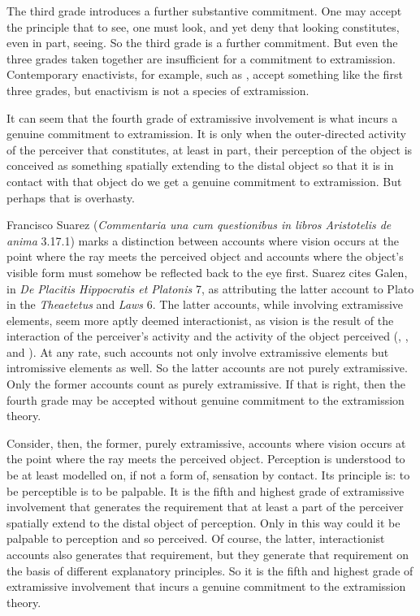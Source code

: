 \documentclass[12pt]{article}
\begin{document}
The third grade introduces a further substantive commitment. One may accept the principle that to see, one must look, and yet deny that looking constitutes, even in part, seeing. So the third grade is a further commitment. But even the three grades taken together are insufficient for a commitment to extramission. Contemporary enactivists, for example, such as \citet{Noe:2004fk}, accept something like the first three grades, but enactivism is not a species of extramission.

It can seem that the fourth grade of extramissive involvement is what incurs a genuine commitment to extramission. It is only when the outer-directed activity of the perceiver that constitutes, at least in part, their perception of the object is conceived as something spatially extending to the distal object so that it is in contact with that object do we get a genuine commitment to extramission. But perhaps that is overhasty. 

Francisco Suarez (\emph{Commentaria una cum questionibus in libros Aristotelis de anima} 3.17.1) marks a distinction between accounts where vision occurs at the point where the ray meets the perceived object and accounts where the object's visible form must somehow be reflected back to the eye first. Suarez cites Galen, in \emph{De Placitis Hippocratis et Platonis} 7, as attributing the latter account to Plato in the \emph{Theaetetus} and \emph{Laws} 6. The latter accounts, while involving extramissive elements, seem more aptly deemed interactionist, as vision is the result of the interaction of the perceiver's activity and the activity of the object perceived (\citealt[22--23]{Smith:1996sh}, \citealt{Remes:2014en}, and \citealt{Squire:2016aa}). At any rate, such accounts not only involve extramissive elements but intromissive elements as well. So the latter accounts are not purely extramissive. Only the former accounts count as purely extramissive. If that is right, then the fourth grade may be accepted without genuine commitment to the extramission theory.

Consider, then, the former, purely extramissive, accounts where vision occurs at the point where the ray meets the perceived object. Perception is understood to be at least modelled on, if not a form of, sensation by contact. Its principle is: to be perceptible is to be palpable. It is the fifth and highest grade of extramissive involvement that generates the requirement that at least a part of the perceiver spatially extend to the distal object of perception. Only in this way could it be palpable to perception and so perceived. Of course, the latter, interactionist accounts also generates that requirement, but they generate that requirement on the basis of different explanatory principles. So it is the fifth and highest grade of extramissive involvement that incurs a genuine commitment to the extramission theory. 
\end{document}
